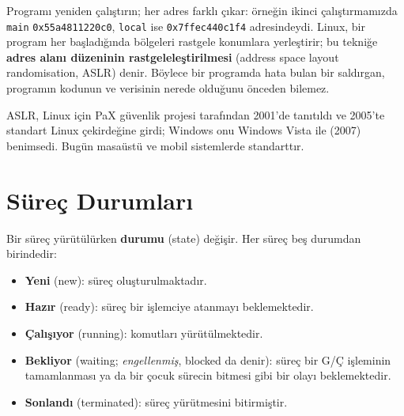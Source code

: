 \documentclass[11pt,a4paper]{article}
\newcommand{\term}[1]{\textbf{\color{mintdeep}#1}}
\begin{document}
Programı yeniden çalıştırın; her adres farklı çıkar: örneğin ikinci çalıştırmamızda \texttt{main} \texttt{0x55a4811220c0}, \texttt{local} ise \texttt{0x7ffec440c1f4} adresindeydi. Linux, bir program her başladığında bölgeleri rastgele konumlara yerleştirir; bu tekniğe \term{adres alanı düzeninin rastgeleleştirilmesi} (address space layout randomisation, ASLR) denir. Böylece bir programda hata bulan bir saldırgan, programın kodunun ve verisinin nerede olduğunu önceden bilemez.

\begin{histnote}[ASLR]
ASLR, Linux için PaX güvenlik projesi tarafından 2001'de tanıtıldı ve 2005'te standart Linux çekirdeğine girdi; Windows onu Windows Vista ile (2007) benimsedi. Bugün masaüstü ve mobil sistemlerde standarttır.
\end{histnote}

\section{Süreç Durumları}
\label{sec:states}

Bir süreç yürütülürken \term{durumu} (state) değişir. Her süreç beş durumdan birindedir:

\begin{itemize}
  \item \textbf{Yeni} (new): süreç oluşturulmaktadır.
  \item \textbf{Hazır} (ready): süreç bir işlemciye atanmayı beklemektedir.
  \item \textbf{Çalışıyor} (running): komutları yürütülmektedir.
  \item \textbf{Bekliyor} (waiting; \emph{engellenmiş}, blocked da denir): süreç bir G/Ç işleminin tamamlanması ya da bir çocuk sürecin bitmesi gibi bir olayı beklemektedir.
  \item \textbf{Sonlandı} (terminated): süreç yürütmesini bitirmiştir.
\end{itemize}
\end{document}
